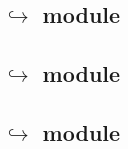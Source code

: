 \subsection{\txnSystemDataMod{} $\hookrightarrow$ \wcpMod{} module}               \label{system transaction: lookups: wcp}                            
\subsection{\txnSystemDataMod{} $\hookrightarrow$ \eucMod{} module}               \label{system transaction: lookups: euc}                            
\subsection{\txnSystemDataMod{} $\hookrightarrow$ \btcMod{} module}               \label{system transaction: lookups: block data}                     
